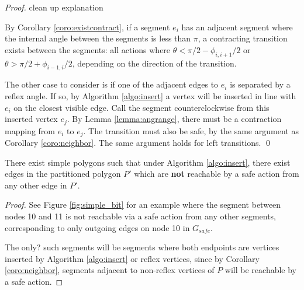 \documentclass[]{styles/svproc}  %
\begin{document}
\begin{proof}

{\color{red} clean up explanation}

By Corollary \ref{coro:existcontract}, if a segment $e_i$ has an adjacent segment
where the internal angle between the segments is less than $\pi$, a contracting
transition exists between the segments: all actions where $\theta < \pi/2 -
\phi_{i,i+1}/2$ or $\theta > \pi/2 + \phi_{i-1,i}/2$, depending on the direction
of the transition.

The other case to consider is if one of the adjacent edges to $e_i$ is
separated by a reflex angle. If so, by Algorithm \ref{algo:insert} a vertex
will be inserted in line with $e_i$ on the closest visible edge. Call the
segment counterclockwise from this inserted vertex $e_j$. 
By Lemma
\ref{lemma:angrange}, there must be a contraction mapping from $e_i$ to $e_j$.
The transition must also be safe, by the same argument as Corollary
\ref{coro:neighbor}. The same argument holds for left transitions.
\qed
\end{proof}

\begin{proposition}
There exist simple polygons such that under Algorithm \ref{algo:insert}, there
exist edges in the partitioned polygon $P'$ which are \textbf{not} reachable by 
a safe action from any other edge in $P'$.
\end{proposition}

\begin{proof}
See Figure \ref{fig:simple_bit} for an example where the segment between nodes
10 and 11 is not reachable via a safe action from any other segments,
corresponding to only outgoing edges on node 10 in $G_{safe}$.

The {\color{red}only?} such segments will be
segments where both endpoints are vertices inserted by Algorithm
\ref{algo:insert} or reflex vertices, since by Corollary \ref{coro:neighbor},
segments adjacent to non-reflex vertices of $P$ will be reachable by a safe
action.
\end{proof}
\end{document}
